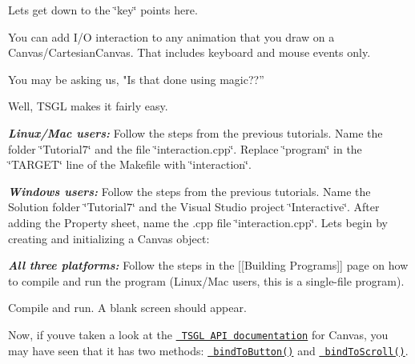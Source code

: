 Let\textquotesingle{}s get down to the \char`\"{}key\char`\"{} points here.

You can add I/O interaction to any animation that you draw on a Canvas/\+Cartesian\+Canvas. That includes keyboard and mouse events only.

You may be asking us, "Is that done using magic??”

Well, T\+S\+GL makes it fairly easy.

{\itshape {\bfseries{Linux/\+Mac users\+:}}} Follow the steps from the previous tutorials. Name the folder \char`\"{}\+Tutorial7\char`\"{} and the file \char`\"{}interaction.\+cpp\char`\"{}. Replace \char`\"{}program\char`\"{} in the \char`\"{}\+T\+A\+R\+G\+E\+T\char`\"{} line of the Makefile with \char`\"{}interaction\char`\"{}.

{\itshape {\bfseries{Windows users\+:}}} Follow the steps from the previous tutorials. Name the Solution folder \char`\"{}\+Tutorial7\char`\"{} and the Visual Studio project \char`\"{}\+Interactive\char`\"{}. After adding the Property sheet, name the .cpp file \char`\"{}interaction.\+cpp\char`\"{}. Let\textquotesingle{}s begin by creating and initializing a Canvas object\+:

{\itshape {\bfseries{All three platforms\+:}}} Follow the steps in the \mbox{[}\mbox{[}Building Programs\mbox{]}\mbox{]} page on how to compile and run the program (Linux/\+Mac users, this is a single-\/file program).


\begin{DoxyCode}{0}
\DoxyCodeLine{\textcolor{preprocessor}{\#include <tsgl.h>}}
\DoxyCodeLine{}
\DoxyCodeLine{\}}
\end{DoxyCode}


Compile and run. A blank screen should appear.

Now, if you\textquotesingle{}ve taken a look at the \href{http://calvin-cs.github.io/TSGL/html/index.html}{\texttt{ T\+S\+GL A\+PI documentation}} for Canvas, you may have seen that it has two methods\+: \href{http://calvin-cs.github.io/TSGL/html/classtsgl_1_1_canvas.html\#a26f2f1acf2b80eee95e42bc13dbc7600}{\texttt{ bind\+To\+Button()}} and \href{http://calvin-cs.github.io/TSGL/html/classtsgl_1_1_canvas.html\#aecd3d94790d2e660db380a5e951ae394}{\texttt{ bind\+To\+Scroll()}}.

